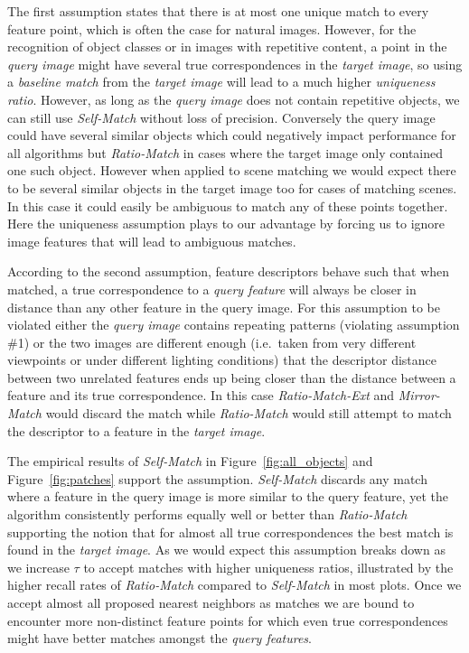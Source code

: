 \documentclass[review]{elsarticle}
\begin{document}
The first assumption states that there is at most one unique match to every feature point, which is often the case for natural images. However, for the recognition of object classes or in images with repetitive content, a point in the \emph{query image} might have several true correspondences in the \emph{target image}, so using a \emph{baseline match} from the \emph{target image} will lead to a much higher \emph{uniqueness ratio}. However, as long as the \emph{query image} does not contain repetitive objects, we can still use \emph{Self-Match} without loss of precision. Conversely the query image could have several similar objects which could negatively impact performance for all algorithms but \emph{Ratio-Match} in cases where the target image only contained one such object. However when applied to scene matching we would expect there to be several similar objects in the target image too for cases of matching scenes. In this case it could easily be ambiguous to match any of these points together. Here the uniqueness assumption plays to our advantage by forcing us to ignore image features that will lead to ambiguous matches.

According to the second assumption, feature descriptors behave such that when matched, a true correspondence to a \emph{query feature} will always be closer in distance than any other feature in the query image. For this assumption to be violated either the \emph{query image} contains repeating patterns (violating assumption \#1) or the two images are different enough (i.e.\ taken from very different viewpoints or under different lighting conditions) that the descriptor distance between two unrelated features ends up being closer than the distance between a feature and its true correspondence. In this case \emph{Ratio-Match-Ext} and \emph{Mirror-Match} would discard the match while \emph{Ratio-Match} would still attempt to match the descriptor to a feature in the \emph{target image}. 

The empirical results of \emph{Self-Match} in Figure~\ref{fig:all_objects} and Figure~\ref{fig:patches} support the assumption. \emph{Self-Match} discards any match where a feature in the query image is more similar to the query feature, yet the algorithm consistently performs equally well or better than \emph{Ratio-Match} supporting the notion that for almost all true correspondences the best match is found in the \emph{target image}. As we would expect this assumption breaks down as we increase $\tau$ to accept matches with higher uniqueness ratios, illustrated by the higher recall rates of \emph{Ratio-Match} compared to \emph{Self-Match} in most plots. Once we accept almost all proposed nearest neighbors as matches we are bound to encounter more non-distinct feature points for which even true correspondences might have better matches amongst the \emph{query features}.
\end{document}
